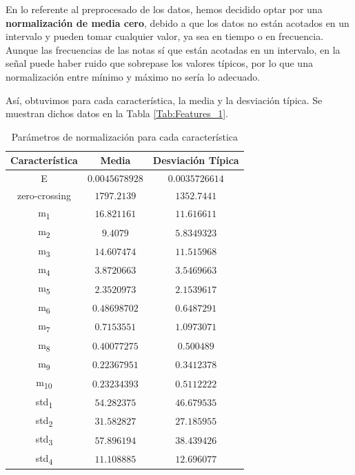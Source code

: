 \documentclass[12pt]{article}
\begin{document}
\bigskip
En lo referente al preprocesado de los datos, hemos decidido optar por una \textbf{normalización de media cero},
debido a que los datos no están acotados en un intervalo y pueden tomar cualquier valor, ya sea
en tiempo o en frecuencia.
Aunque las frecuencias de las notas sí que están acotadas en un intervalo, en la señal
puede haber ruido que sobrepase los valores típicos, por lo que una normalización entre mínimo y máximo no sería lo adecuado.

Así, obtuvimos para cada característica, la media y la desviación típica. Se muestran dichos datos en la Tabla \ref{Tab:Features_1}.

\newpage

\begin{table}[!ht]
	\caption{Parámetros de normalización para cada característica}
	\centering
		\begin{tabular}{||c c c||}
			\hline
			Característica & Media & Desviación Típica  \\ [0.5ex]
			\hline\hline
			E & $0.0045678928$ & $0.0035726614$ \\
			\hline
			zero-crossing & $1797.2139$ & $1352.7441$ \\
			\hline
			m\textsubscript{1} & $16.821161$ & $11.616611$ \\
			\hline
			m\textsubscript{2} & $9.4079$ & $5.8349323$ \\
			\hline
			m\textsubscript{3} & $14.607474$ & $11.515968$ \\
			\hline
			m\textsubscript{4} & $3.8720663$ & $3.5469663$ \\
			\hline
			m\textsubscript{5} & $2.3520973$ & $2.1539617$ \\
			\hline
			m\textsubscript{6} & $0.48698702$ & $0.6487291$ \\
			\hline
			m\textsubscript{7} & $0.7153551$ & $1.0973071$ \\
			\hline
			m\textsubscript{8} & $0.40077275$ & $0.500489$ \\
			\hline
			m\textsubscript{9} & $0.22367951$ & $0.3412378$ \\
			\hline
			m\textsubscript{10} & $0.23234393$ & $0.5112222$ \\
			\hline
			std\textsubscript{1} & $54.282375$ & $46.679535$ \\
			\hline
			std\textsubscript{2} & $31.582827$ & $27.185955$ \\
			\hline
			std\textsubscript{3} & $57.896194$ & $38.439426$ \\
			\hline
			std\textsubscript{4} & $11.108885$ & $12.696077$ \\

\end{tabular}
\end{table}
\end{document}

